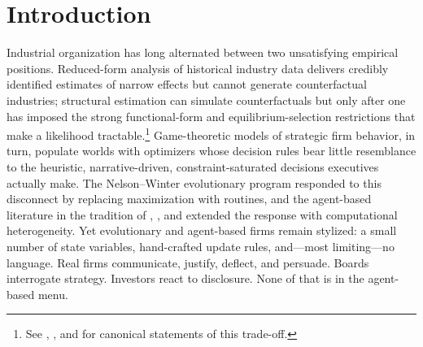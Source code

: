 \documentclass[11pt]{article}
\begin{document}
\begin{abstract}
shift behaviour. (v) The PE channel functions as Schumpeterian
renewal: it is the financial intermediary's decision rule that prevents
the industry from collapsing to monopoly, with the rate of competitive
turnover monotonic in PE underwriting capacity. (vi) Equity-market
reflexivity emerges from the panel's correlated anchoring tendency
combined with the firm's narrative interpretation of price moves,
generating a Soros-style price--fundamental feedback loop without
either side being programmed to produce it. We discuss what the
laboratory does and does not deliver, the engineering choices that
determine which findings should be taken as substantive versus
artifactual, and the methodological position LLM industrial
organization occupies between agent-based modeling, structural
estimation, and behavioural theory of the firm.
\bigskip

\noindent\textit{JEL Codes:} L11, L13, G33, C63, D83.
\smallskip

\noindent\textit{Keywords:} industrial organization, agent-based models,
large language models, simulation, market structure, financial distress.
\end{abstract}

\thispagestyle{empty}
\newpage

\section{Introduction}

Industrial organization has long alternated between two unsatisfying
empirical positions. Reduced-form analysis of historical industry data
delivers credibly identified estimates of narrow effects but cannot
generate counterfactual industries; structural estimation can simulate
counterfactuals but only after one has imposed the strong functional-form
and equilibrium-selection restrictions that make a likelihood
tractable.\footnote{See \citet{ackerberg2007econometric}, \citet{pakes2003}, and
\citet{aguirregabiria2010dynamic} for canonical statements of this trade-off.}
Game-theoretic models of strategic firm behavior, in turn, populate worlds
with optimizers whose decision rules bear little resemblance to the
heuristic, narrative-driven, constraint-saturated decisions executives
actually make. The Nelson--Winter \citeyearpar{nelsonwinter1982} evolutionary
program responded to this disconnect by replacing maximization with
routines, and the agent-based literature in the tradition of
\citet{tesfatsion2006agent}, \citet{axtell2001zipf}, and
\citet{farmer2009economy} extended the response with computational
heterogeneity. Yet evolutionary and agent-based firms remain stylized: a
small number of state variables, hand-crafted update rules, and---most
limiting---no language. Real firms communicate, justify, deflect, and
persuade. Boards interrogate strategy. Investors react to disclosure. None
of that is in the agent-based menu.
\end{document}

